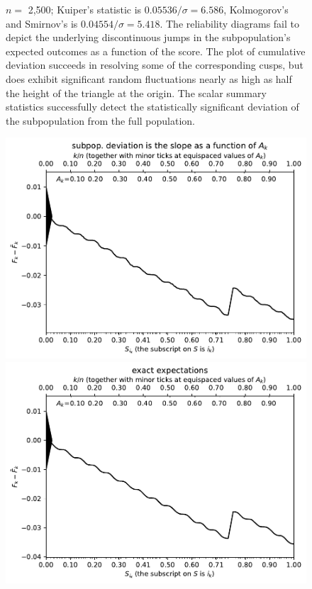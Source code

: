 \documentclass{article}
\begin{document}
\begin{figure}
\begin{centering}
\end{centering}
\caption{$n =$ 2,500;
         Kuiper's statistic is $0.05536 / \sigma = 6.586$,
         Kolmogorov's and Smirnov's is $0.04554 / \sigma = 5.418$.
The reliability diagrams fail to depict
the underlying discontinuous jumps in the subpopulation's expected outcomes
as a function of the score. The plot of cumulative deviation succeeds
in resolving some of the corresponding cusps, but does exhibit significant
random fluctuations nearly as high as half the height of the triangle
at the origin.
The scalar summary statistics successfully
detect the statistically significant deviation
of the subpopulation from the full population.
}
\label{2500}
\end{figure}


\begin{figure}
\begin{centering}

\parbox{\imsize}{\includegraphics[width=\imsize]
                 {./codes/weighted/50000_2500_10_3/cumulative.pdf}}
\quad\quad
\parbox{\imsize}{\includegraphics[width=\imsize]
                 {./codes/weighted/50000_2500_10_3/cumulative_exact.pdf}}


\end{centering}
\end{figure}
\end{document}
